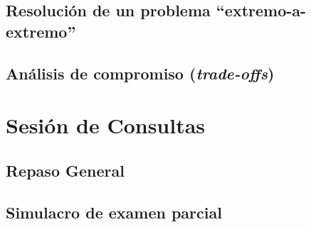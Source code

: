 \documentclass[11pt,a4paper,openany]{book}
\begin{document}
\section{Resolución de un problema ``extremo-a-extremo''}

\section{Análisis de compromiso (\textit{trade-offs})}

\chapter{Sesión de Consultas}

\section{Repaso General}

\section{Simulacro de examen parcial}


%
\end{document}
